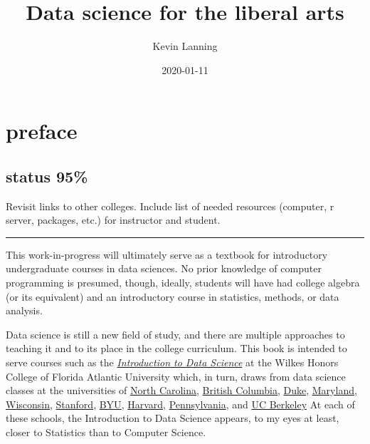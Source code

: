 \documentclass[
  openany]{book}
\title{Data science for the liberal arts}
\author{Kevin Lanning}
\date{2020-01-11}
\begin{document}
\maketitle

{
\setcounter{tocdepth}{1}
\tableofcontents
}
\hypertarget{section}{%
\chapter*{}\label{section}}

\hypertarget{preface}{%
\chapter*{preface}\label{preface}}

\hypertarget{status-95}{%
\section*{status 95\%}\label{status-95}}

Revisit links to other colleges. Include list of needed resources (computer, r server, packages, etc.) for instructor and student.

\begin{center}\rule{0.5\linewidth}{\linethickness}\end{center}

This work-in-progress will ultimately serve as a textbook for introductory undergraduate courses in data sciences. No prior knowledge of computer programming is presumed, though, ideally, students will have had college algebra (or its equivalent) and an introductory course in statistics, methods, or data analysis.

Data science is still a new field of study, and there are multiple approaches to teaching it and to its place in the college curriculum. This book is intended to serve courses such as the \href{https://kevinlanning.github.io/DataSciSpring2019/}{\emph{\emph{Introduction to Data Science}}} at the Wilkes Honors College of Florida Atlantic University which, in turn, draws from data science classes at the universities of \href{https://idc9.github.io/stor390/}{North Carolina}, \href{https://github.com/STAT545-UBC/STAT545-UBC.github.io}{British Columbia}, \href{https://www2.stat.duke.edu/courses/Fall15/sta112.01/}{Duke}, \href{http://www.hcbravo.org/IntroDataSci/calendar/}{Maryland}, \href{http://pages.stat.wisc.edu/~yandell/R_for_data_sciences/syllabus.html}{Wisconsin}, \href{https://github.com/dcl-2017-04/curriculum}{Stanford}, \href{https://byuistats.github.io/M335/syllabus.html}{BYU}, \href{http://datasciencelabs.github.io/}{Harvard}, \href{https://github.com/MUSA-620-Spring-2017/Course-Materials}{Pennsylvania}, and \href{https://github.com/FAUDataScience/stat259}{UC Berkeley} At each of these schools, the Introduction to Data Science appears, to my eyes at least, closer to Statistics than to Computer Science.
\end{document}

